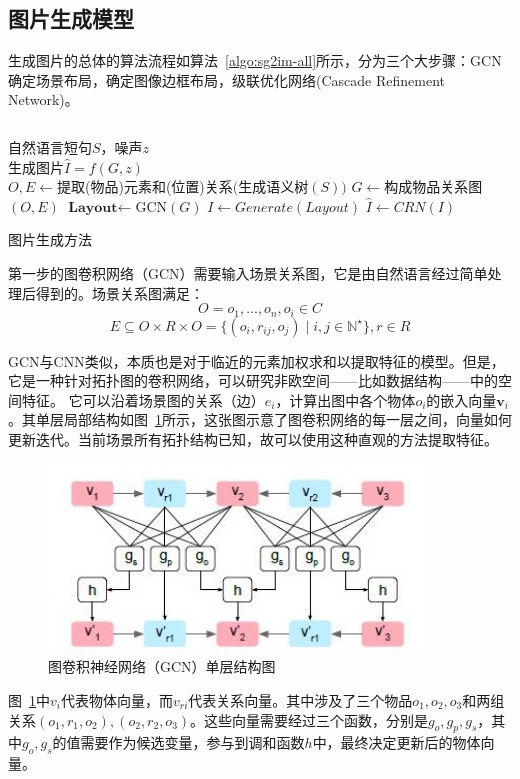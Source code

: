 \subsection{图片生成模型}
生成图片的总体的算法流程如算法~\ref{algo:sg2im-all}所示，分为三个大步骤：GCN确定场景布局，确定图像边框布局，级联优化网络(Cascade Refinement Network)。

$$$$
\begin{algorithm}[H]
    \SetAlgoLined
    \vspace{2em}
    \algorithmicrequire 自然语言短句$S$，噪声$z$\\
    \algorithmicensure 生成图片$\hat{I} = f(G,z)$\\
    $O,E \gets $提取(物品)元素和(位置)关系$($生成语义树$(S))$\;
    $G \gets $构成物品关系图$(O,E)$\;
    $\textbf{Layout} \gets $GCN$(G)$\;
    $I \gets Generate(Layout)$ \;
    $\hat{I} \gets CRN(I)$\;
    \caption{图片生成方法}
    \label{algo:sg2im-all}
\end{algorithm}

\vspace{2em}
第一步的图卷积网络（GCN）需要输入场景关系图，它是由自然语言经过简单处理后得到的。场景关系图满足：
$$O={o_1,...,o_n},o_i \in C$$
$$E \subseteq O \times R \times O =\{(o_i,r_{ij},o_j)\mid i,j \in \mathbb{N}^\star\}, r \in R$$

GCN与CNN类似，本质也是对于临近的元素加权求和以提取特征的模型。但是，它是一种针对拓扑图的卷积网络，可以研究非欧空间——比如数据结构——中的空间特征。
它可以沿着场景图的关系（边）$e_i$，计算出图中各个物体$o_i$的嵌入向量$ \textbf{v}_i$。其单层局部结构如图~\ref{fig:gcn}所示，这张图示意了图卷积网络的每一层之间，向量如何更新迭代。当前场景所有拓扑结构已知，故可以使用这种直观的方法提取特征。

\begin{figure}[!htb]
    \centering
    \includegraphics[width=0.9\textwidth]{figures/gcn.png}
    \caption{图卷积神经网络（GCN）单层结构图}
    \label{fig:gcn}
\end{figure}
图~\ref{fig:gcn}中$v_i$代表物体向量，而$v_{ri}$代表关系向量。其中涉及了三个物品$o_1, o_2, o_3$和两组关系$(o_1,r_1,o_2), (o_2,r_2,o_3)$。这些向量需要经过三个函数，分别是$g_o, g_p, g_s$，其中$g_o, g_s$的值需要作为候选变量，参与到调和函数$h$中，最终决定更新后的物体向量。

